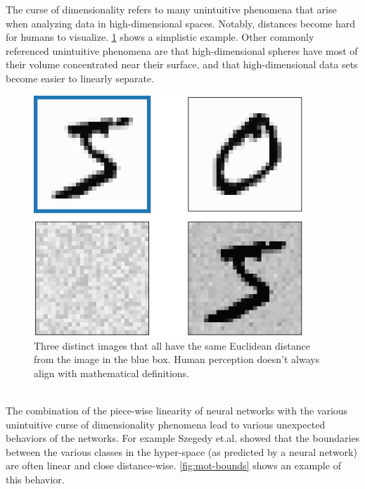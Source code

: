 \documentclass[12pt,oneside]{CUNY_PhD}
\begin{document}
The curse of dimensionality refers to many unintuitive phenomena that arise when analyzing data in high-dimensional spaces. Notably, distances become hard for humans to visualize. \ref{fig:mot-dist} shows a simplistic example. Other commonly referenced unintuitive phenomena are that high-dimensional spheres have most of their volume concentrated near their surface, and that high-dimensional data sets become easier to linearly separate.
\begin{figure}[!htbp]
    \centering
    \includegraphics[width=0.9\textwidth]{images/Motivation/motivation-distances.png}
    \caption{Three distinct images that all have the same Euclidean distance from the image in the blue box. Human perception doesn't always align with mathematical definitions.}
    \label{fig:mot-dist}
\end{figure}\\
The combination of the piece-wise linearity of neural networks with the various unintuitive curse of dimensionality phenomena lead to various unexpected behaviors of the networks. For example Szegedy et.al.\cite{szegedy2013intriguing} showed that the boundaries between the various classes in the hyper-space (as predicted by a neural network) are often linear and close distance-wise. \ref{fig:mot-bounds} shows an example of this behavior.
\end{document}
